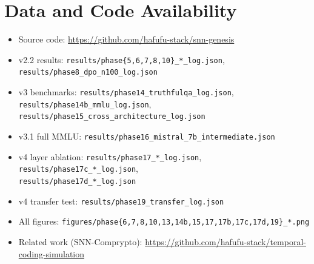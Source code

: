 \documentclass[11pt,a4paper]{article}
\begin{document}
\section*{Data and Code Availability}
\begin{itemize}
    \item Source code: \url{https://github.com/hafufu-stack/snn-genesis}
    \item v2.2 results: \texttt{results/phase\{5,6,7,8,10\}\_*\_log.json},\\
          \texttt{results/phase8\_dpo\_n100\_log.json}
    \item v3 benchmarks: \texttt{results/phase14\_truthfulqa\_log.json},\\
          \texttt{results/phase14b\_mmlu\_log.json},\\
          \texttt{results/phase15\_cross\_architecture\_log.json}
    \item v3.1 full MMLU: \texttt{results/phase16\_mistral\_7b\_intermediate.json}
    \item v4 layer ablation: \texttt{results/phase17\_*\_log.json},\\
          \texttt{results/phase17c\_*\_log.json},\\
          \texttt{results/phase17d\_*\_log.json}
    \item v4 transfer test: \texttt{results/phase19\_transfer\_log.json}
    \item All figures: \texttt{figures/phase\{6,7,8,10,13,14b,15,17,17b,17c,17d,19\}\_*.png}
    \item Related work (SNN-Comprypto): \url{https://github.com/hafufu-stack/temporal-coding-simulation}
\end{itemize}
\end{document}
